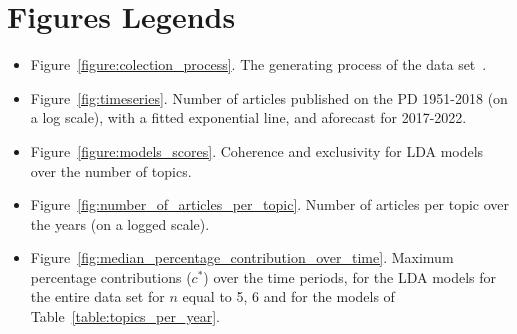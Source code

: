 \documentclass{article}
\theoremstyle{definition}
\begin{document}
\section{Figures Legends}

\begin{itemize}
  \item Figure~\ref{figure:colection_process}. The generating process of the
  data set~\citep{pd_data_2018}.
  \item Figure~\ref{fig:timeseries}. Number of articles published on the PD
  1951-2018 (on a log scale), with a fitted exponential line, and aforecast for
  2017-2022.
  \item Figure~\ref{figure:models_scores}. Coherence and exclusivity for LDA
  models over the number of topics.
  \item Figure~\ref{fig:number_of_articles_per_topic}. Number of articles per
  topic over the years (on a logged scale).
  \item Figure~\ref{fig:median_percentage_contribution_over_time}. Maximum
  percentage contributions (\(c^*\)) over the time periods,
  for the LDA models for the entire data set for \(n\) equal to 5, 6
  and for the models of Table~\ref{table:topics_per_year}.
\end{itemize}
\end{document}

